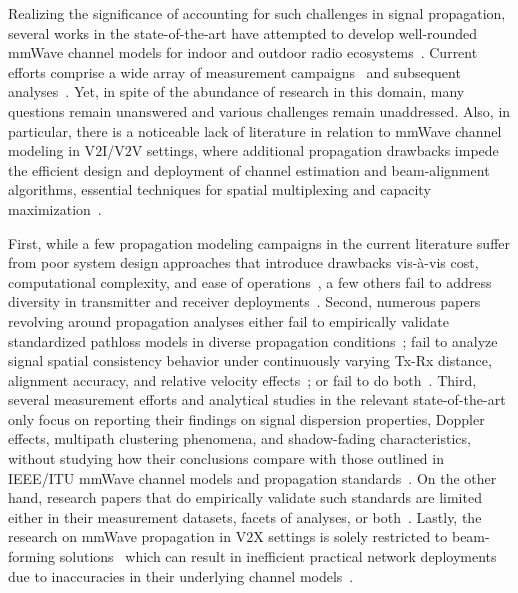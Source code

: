 \documentclass[12pt, draftcls, onecolumn]{IEEEtran}
\begin{document}
Realizing the significance of accounting for such challenges in signal propagation, several works in the state-of-the-art have attempted to develop well-rounded mmWave channel models for indoor and outdoor radio ecosystems~\cite{NISTModeling, Outdoor28G, Indoor60G, QDC_NIST, D2DHumanBlockage}. Current efforts comprise a wide array of measurement campaigns~\cite{Purdue, Foliage, AgileLink, Harvard, Outdoor28G, PDAPs, MolischSpatialIndoorOutdoor, DopplerHST} and subsequent analyses~\cite{SuburbanGeometryJournal, FoliageSimulations, Indoor60G, Qualcomm3GPP, MacCartneyModelsOverview, SpatialConsistencyOriginal, MacCartneyRural, MolischEstimate}. Yet, in spite of the abundance of research in this domain, many questions remain unanswered and various challenges remain unaddressed. Also, in particular, there is a noticeable lack of literature in relation to mmWave channel modeling in V$2$I/V$2$V settings, where additional propagation drawbacks impede the efficient design and deployment of channel estimation and beam-alignment algorithms, essential techniques for spatial multiplexing and capacity maximization~\cite{VehicularBeamSelection, CVBeamAlignmentV2X}. 

First, while a few propagation modeling campaigns in the current literature suffer from poor system design approaches that introduce drawbacks vis-\`{a}-vis cost, computational complexity, and ease of operations~\cite{Purdue, Foliage, AgileLink}, a few others fail to address diversity in transmitter and receiver deployments~\cite{Harvard, Indoor60G, MacCartneyRural}. Second, numerous papers revolving around propagation analyses either fail to empirically validate standardized pathloss models in diverse propagation conditions~\cite{SpatialConsistencyOriginal, MolischSpatialOutdoor, MacCartneySpatialStatistics}; fail to analyze signal spatial consistency behavior under continuously varying Tx-Rx distance, alignment accuracy, and relative velocity effects~\cite{Outdoor28G, Qualcomm3GPP, MacCartneyModelsOverview}; or fail to do both~\cite{Indoor60G, SuburbanGeometryJournal, FoliageSimulations}. Third, several measurement efforts and analytical studies in the relevant state-of-the-art only focus on reporting their findings on signal dispersion properties, Doppler effects, multipath clustering phenomena, and shadow-fading characteristics, without studying how their conclusions compare with those outlined in IEEE/ITU mmWave channel models and propagation standards~\cite{PDAPs, DopplerHST, Outdoor28G, SpatialDynamics, V2XBlockages}. On the other hand, research papers that do empirically validate such standards are limited either in their measurement datasets, facets of analyses, or both~\cite{Indoor60G, NISTModeling, QDC_NIST, D2DHumanBlockage}. Lastly, the research on mmWave propagation in V$2$X settings is solely restricted to beam-forming solutions~\cite{VehicularBeamSelection, CVBeamAlignmentV2X} which can result in inefficient practical network deployments due to inaccuracies in their underlying channel models~\cite{MolischEstimate, IoV}.
\end{document}
